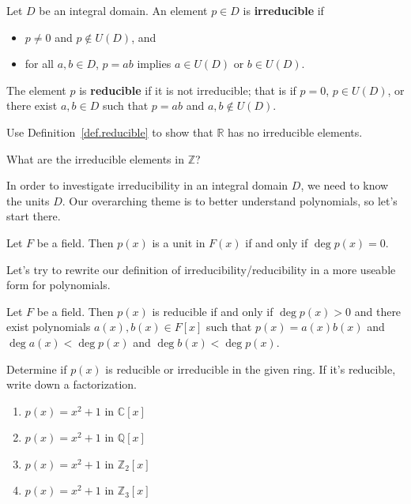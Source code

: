 \begin{definition}\label{def.reducible}
Let $D$ be an integral domain. An element $p\in D$ is \textbf{irreducible} if 
\begin{itemize}
\item $p\neq 0$ and $p\notin U(D)$, and
\item for all $a,b\in D$, $p = ab$ implies $a\in U(D)$ or $b\in U(D)$.
\end{itemize} 
The element $p$ is \textbf{reducible} if it is not irreducible; that is if $p=0$, $p\in U(D)$, or there exist $a,b\in D$ such that $p = ab$ and $a,b\notin U(D)$. 
\end{definition}

\begin{problem}
Use Definition~\ref{def.reducible} to show that $\mathbb{R}$ has no irreducible elements.
\end{problem}

\begin{problem}
What are the irreducible elements in $\mathbb{Z}$?
\end{problem}

In order to investigate irreducibility in an integral domain $D$, we need to know the units $D$. Our overarching theme is to better understand polynomials, so let's 
start there. 

\begin{theorem}\label{thm.UnitsFAdjoinx}
Let $F$ be a field. Then $p(x)$ is a unit in $F(x)$ if and only if $\deg p(x) = 0$. 
\end{theorem}

Let's try to rewrite our definition of irreducibility/reducibility in a more useable form for polynomials.
\begin{theorem}
Let $F$ be a field. Then $p(x)$ is reducible if and only if $\deg p(x) > 0$ and there exist polynomials $a(x),b(x) \in F[x]$ such that $p(x) = a(x)b(x)$ and $\deg a(x) <\deg p(x)$ and $\deg b(x) <\deg p(x)$.
\end{theorem}

\begin{problem}
Determine if $p(x)$ is reducible or irreducible in the given ring. If it's reducible, write down a factorization.
\begin{multicols}{2}
\begin{enumerate}
\item $p(x) = x^2+1$ in $\mathbb{C}[x]$
\item $p(x) = x^2+1$ in $\mathbb{Q}[x]$
\item $p(x) = x^2+1$ in $\mathbb{Z}_2[x]$
\item $p(x) = x^2+1$ in $\mathbb{Z}_3[x]$
\end{enumerate}
\end{multicols}
\end{problem}

